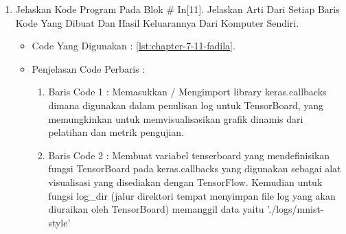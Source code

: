 \begin{enumerate}
\begin{itemize}
\begin{enumerate}
\item Baris Code 11	: Melakukan konfigurasi dari proses pembelajaran, yang dilakukan melalui metode compile,sebelum melatih suatu model.
\item Baris Code 12	: Mencetak dan menampilkan representasi ringkasan model yang telah dibuat berdasrkan fungsi-fungsi yang diterapkan
\end{enumerate}
\par
\item Hasil : \ref{chapter-7-in-10-fadila}
\par
\par
\begin{figure}[!hbtp]
\centering
\texttt{[image: figures/chapter-7-in-10-fadila.jpg]}
\caption{Code Program Pada In [10] - fadila}
\label{chapter-7-in-10-fadila}
\end{figure}
\par
\par
\end{itemize}
\par
\par
\par
\item Jelaskan Kode Program Pada Blok \# In[11]. Jelaskan Arti Dari Setiap Baris Kode Yang Dibuat Dan Hasil Keluarannya Dari Komputer Sendiri.
\begin{itemize}
\item Code Yang Digunakan : \ref{lst:chapter-7-11-fadila}.

\par
\par
\item Penjelasan Code Perbaris	: 
\begin{enumerate}
\item Baris Code 1	: Memasukkan / Mengimport library keras.callbacks dimana digunakan dalam penulisan log untuk TensorBoard, yang memungkinkan untuk memvisualisasikan grafik dinamis dari pelatihan dan metrik pengujian.
\item Baris Code 2	: Membuat variabel tenserboard yang mendefinisikan fungsi TensorBoard pada keras.callbacks yang digunakan sebagai alat visualisasi yang disediakan dengan TensorFlow. Kemudian untuk fungsi log\_dir (jalur direktori tempat menyimpan file log yang akan diuraikan oleh TensorBoard) memanggil data yaitu './logs/mnist-style'
\end{enumerate}
\par

\end{itemize}
\end{enumerate}
